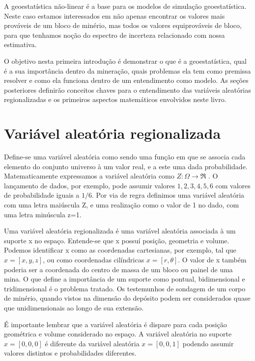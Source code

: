 A geoestatística não-linear é a base para os modelos de simulação geoestatística. Neste caso estamos interessados em não apenas encontrar os valores mais prováveis de um bloco de minério, mas todos os valores equiprováveis de bloco, para que tenhamos noção do espectro de incerteza relacionado com nossa estimativa.   

O objetivo nesta primeira introdução é demonstrar o que é a geoestatística, qual é a sua importância dentro da mineração, quais problemas ela tem como premissa resolver e como ela funciona dentro de um entendimento como modelo. As seções posteriores definirão conceitos chaves para o entendimento das variáveis aleatórias regionalizadas e os primeiros aspectos matemáticos envolvidos neste livro.  


\section{Variável aleatória regionalizada}

Define-se uma variável aleatória como sendo uma função em que se associa cada elemento do conjunto universo à um valor real, e a este uma dada probabilidade. Matematicamente expressamos a variável aleatória como $Z:\Omega \rightarrow \Re $ . O lançamento de dados, por exemplo, pode assumir valores ${1,2,3,4,5,6}$ com valores de probabilidade iguais a $1/6$. Por via de regra definimos uma variável aleatória com uma letra maiúscula Z, e uma realização como o valor de 1 no dado, com uma letra minúscula z=1. 

Uma variável aleatória regionalizada é uma variável aleatória associada à um suporte x no espaço. Entende-se que x possuí posição, geometria e volume. Podemos identificar x como as coordenadas cartesianas, por exemplo, tal que $x=[x,y,z]$, ou como coordenadas cilíndricas $x=[r,\theta]$. O valor de x também poderia ser a coordenada do centro de massa de um bloco ou painel de uma mina. O que define a importância de um suporte como pontual, bidimensional e tridimensional é o problema tratado. Os testemunhos de sondagem de um corpo de minério, quando vistos na dimensão do depósito podem ser considerados quase que unidimensionais ao longo de sua extensão. 

É importante lembrar que a variável aleatória é dispare para cada posição geométrica e volume considerado no espaço. A variável aleatória no suporte $x=[0,0,0]$ é diferente da variável aleatória $x=[0,0,1]$ podendo assumir valores distintos e probabilidades diferentes.

